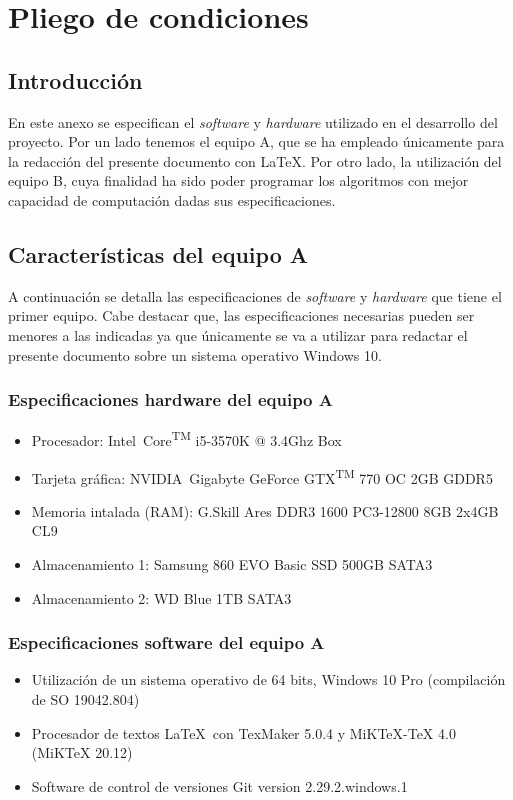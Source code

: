 \chapter{Pliego de condiciones}
\label{cha:pliego-de-condiciones}

\section{Introducción}
\label{sec:intro-pliego}

En este anexo se especifican el \textit{software} y \textit{hardware} utilizado en el desarrollo del proyecto. Por un lado tenemos el equipo A, que se ha empleado únicamente para la redacción del presente documento con \LaTeX. Por otro lado, la utilización del equipo B, cuya finalidad ha sido poder programar los algoritmos con mejor capacidad de computación dadas sus especificaciones.

\section{Características del equipo A}
\label{sec:caracteristicas-equipoa}

A continuación se detalla las especificaciones de \textit{software} y \textit{hardware} que tiene el primer equipo. Cabe destacar que, las especificaciones necesarias pueden ser menores a las indicadas ya que únicamente se va a utilizar para redactar el presente documento sobre un sistema operativo Windows 10.

\subsection{Especificaciones hardware del equipo A}
\label{subsec:especificaciones-hardware-equipoa}
\begin{itemize}
  \item Procesador: Intel\textregistered\ Core\textsuperscript{TM} i5-3570K @ 3.4Ghz Box
  \item Tarjeta gráfica: NVIDIA\textregistered\ Gigabyte GeForce GTX\textsuperscript{TM} 770 OC 2GB GDDR5
  \item Memoria intalada (RAM): G.Skill Ares DDR3 1600 PC3-12800 8GB 2x4GB CL9
  \item Almacenamiento 1: Samsung 860 EVO Basic SSD 500GB SATA3
  \item Almacenamiento 2: WD Blue 1TB SATA3
\end{itemize}

\subsection{Especificaciones software del equipo A}
\label{subsec:especificaciones-software-equipoa}
\begin{itemize}
  \item Utilización de un sistema operativo de 64 bits, Windows 10 Pro (compilación de SO 19042.804)
  \item Procesador de textos \LaTeX\ con TexMaker 5.0.4 y MiKTeX-TeX 4.0 (MiKTeX 20.12)
  \item Software de control de versiones Git version 2.29.2.windows.1
\end{itemize}

